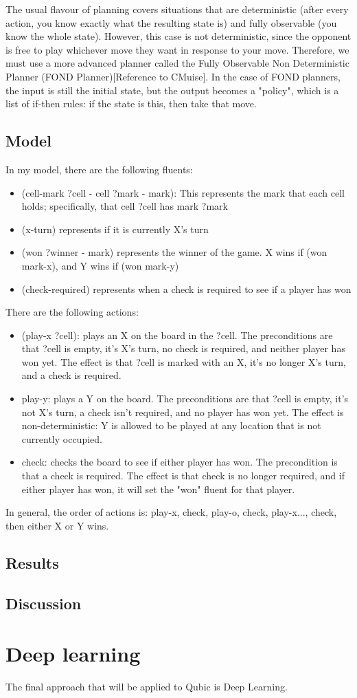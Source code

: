 \documentclass[11pt]{article}
\begin{document}
The usual flavour of planning covers situations that are deterministic (after every action, you know exactly what the resulting state is) and fully observable (you know the whole state). However, this case is not deterministic, since the opponent is free to play whichever move they want in response to your move. Therefore, we must use a more advanced planner called the Fully Observable Non Deterministic Planner (FOND Planner)[Reference to CMuise]. In the case of FOND planners, the input is still the initial state, but the output becomes a "policy", which is a list of if-then rules: if the state is this, then take that move.


\subsection{Model}
In my model, there are the following fluents:
\begin{itemize}
    \item (cell-mark ?cell - cell ?mark - mark): This represents the mark that each cell holds; specifically, that cell ?cell has mark ?mark
    \item (x-turn) represents if it is currently X's turn
    \item (won ?winner - mark) represents the winner of the game. X wins if (won mark-x), and Y wins if (won mark-y) 
    \item (check-required) represents when a check is required to see if a player has won
\end{itemize}

There are the following actions:
\begin{itemize}
    \item (play-x ?cell): plays an X on the board in the ?cell. The preconditions are that ?cell is empty, it's X's turn, no check is required, and neither player has won yet. The effect is that ?cell is marked with an X, it's no longer X's turn, and a check is required.
    \item play-y: plays a Y on the board. The preconditions are that ?cell is empty, it's not X's turn, a check isn't required, and no player has won yet. The effect is non-deterministic: Y is allowed to be played at any location that is not currently occupied.
    \item check: checks the board to see if either player has won. The precondition is that a check is required. The effect is that check is no longer required, and if either player has won, it will set the "won" fluent for that player.
\end{itemize}

In general, the order of actions is: play-x, check, play-o, check, play-x..., check, then either X or Y wins.

\subsection{Results}


\subsection{Discussion}


\section{Deep learning}
The final approach that will be applied to Qubic is Deep Learning.

\lipsum[4-5]
\end{document}
